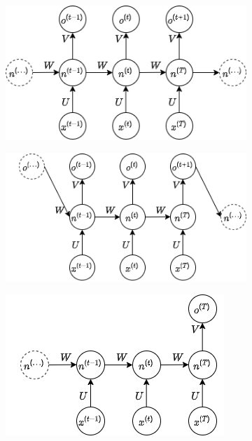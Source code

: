 \documentclass[../../main.tex]{subfiles}
\begin{document}
\begin{figure}[H]
    \centering
    \begin{subfigure}[t]{0.49\textwidth}
        \centering
        \includegraphics[width = \textwidth]{immagini/4_2/recnet2.png}
        \caption{}
        \label{fig:RNNArch1}
    \end{subfigure}
    \begin{subfigure}[t]{0.49\textwidth}
        \centering
        \includegraphics[width = \textwidth]{immagini/4_2/recnet.png}      
        \caption{}  
        \label{fig:RNNArch2}
    \end{subfigure}
    \begin{subfigure}[t]{0.49\textwidth}
        \centering
        \includegraphics[width = \textwidth]{immagini/4_2/recnet3.png}  

\end{subfigure}
\end{figure}
\end{document}
